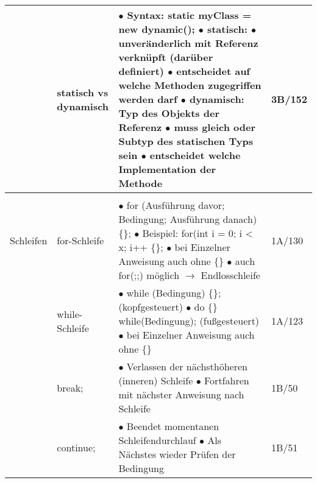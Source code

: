 \documentclass[11pt,a4paper]{article}
\begin{document}
\begin{center}
\begin{longtable}[h]{ | p{2.3cm} | p{2.3cm} | p{12.6cm} | p{1.2cm} | }
	& \makecell[l]{statisch vs \\ dynamisch} & \makecell[l]{$\bullet$ Syntax: static myClass = new dynamic(); \\ 
	$\bullet$ statisch: \\ \hspace{0.2cm} $\bullet$ unveränderlich mit Referenz verknüpft (darüber definiert) \\ 
	\hspace{0.2cm} $\bullet$ entscheidet auf welche Methoden zugegriffen werden darf\\ 
	$\bullet$ dynamisch: Typ des Objekts der Referenz \\ 
	\hspace{0.2cm} $\bullet$ muss gleich oder Subtyp des statischen Typs sein \\ 
	\hspace{0.2cm} $\bullet$ entscheidet welche Implementation der Methode}& 3B/152 \\ 
	\hline
	
	
	
	\multicolumn{3}{c}{} \\ 
	\hline 	 
	 
	 
	 
	{\large Schleifen} & for-Schleife & \makecell[l]{$\bullet$ for (Ausführung davor; Bedingung; Ausführung danach) \{\}; 
	\\ $\bullet$ Beispiel: for(int i = 0; i < x; i++ \{\};\\ $\bullet$ bei Einzelner Anweisung auch ohne \{\}
	\\ $\bullet$ auch for(;;) möglich $\rightarrow$ 	 Endlosschleife }& 1A/130 \\ \cline{2-4}
	
	& while-Schleife & \makecell[l] {$\bullet$ while (Bedingung) \{\}; (kopfgesteuert) \\
	$\bullet$ do \{\} while(Bedingung); (fußgesteuert) \\ $\bullet$ bei Einzelner Anweisung auch ohne \{\}} & 1A/123 \\ \cline{2-4}
	
	& break; & \makecell[l]{ $\bullet$ Verlassen der nächsthöheren (inneren) Schleife \\ 
	$\bullet$ Fortfahren mit nächster Anweisung nach Schleife} & 1B/50\\ \cline{2-4}
	
	& continue; & \makecell[l]{$\bullet$ Beendet momentanen Schleifendurchlauf \\ $\bullet$ Als Nächstes wieder Prüfen der Bedingung}  & 1B/51\\ 
	\hline
	

\end{longtable}
\end{center}
\end{document}
